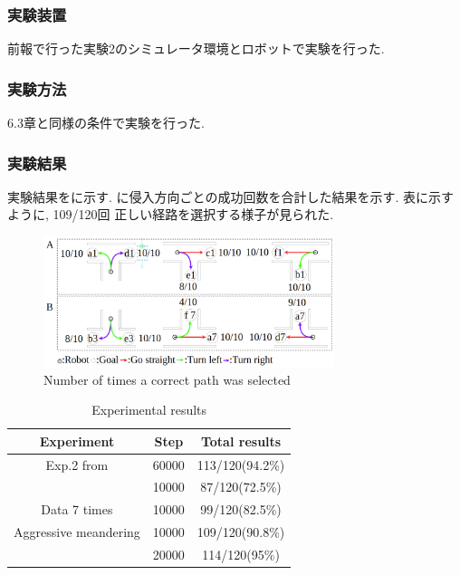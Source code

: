 \documentclass{jarticle}
\begin{document}
\subsubsection{実験装置}
前報\cite{mech}で行った実験2のシミュレータ環境とロボットで実験を行った.

\subsubsection{実験方法}
6.3章と同様の条件で実験を行った.

\subsubsection{実験結果}
実験結果をに示す. に侵入方向ごとの成功回数を合計した結果を示す.
表に示すように, 109/120回 正しい経路を選択する様子が見られた. 

\begin{figure}[h]
  \centering
   \includegraphics[width=85mm]{10000step_act1.5_2.png}
   \vspace*{-4mm}
   \caption{Number of times a correct path was selected}
   \label{fig: fig13}
 \end{figure}

 \vspace{-8mm}

 \begin{table}[H]
  \caption{Experimental results}
  \label{tbl: table5}
  \centering
  \footnotesize
  \vspace{2mm}
  \begin{tabular}{|c|c|c|}
   \hline
   Experiment & Step & Total results \\\hline
   Exp.2 from \cite{mech} & 60000 & 113/120(94.2\%) \\ \cline{2-3}
  & 10000 & 87/120(72.5\%)\\\hline
  Data 7 times & 10000 & 99/120(82.5\%)\\\hline
  Aggressive meandering & 10000 & 109/120(90.8\%) \\ \cline{2-3}
  & 20000 & 114/120(95\%)\\
   \hline
  \end{tabular}
 \end{table}
\end{document}
